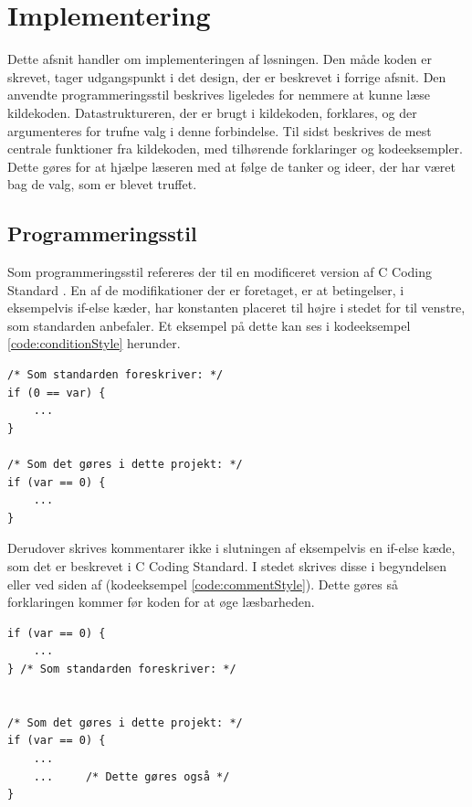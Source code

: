 \section{Implementering}\label{implementering}
Dette afsnit handler om implementeringen af løsningen. Den måde koden er skrevet, tager udgangspunkt i det design, der er beskrevet i forrige afsnit. Den anvendte programmeringsstil beskrives ligeledes for nemmere at kunne læse kildekoden. Datastruktureren, der er brugt i kildekoden, forklares, og der argumenteres for trufne valg i denne forbindelse. Til sidst beskrives de mest centrale funktioner fra kildekoden, med tilhørende forklaringer og kodeeksempler. Dette gøres for at hjælpe læseren med at følge de tanker og ideer, der har været bag de valg, som er blevet truffet.

\subsection*{Programmeringsstil}
Som programmeringsstil refereres der til en modificeret version af C Coding Standard \cite{codingstyle}. En af de modifikationer der er foretaget, er at betingelser, i eksempelvis if-else kæder, har konstanten placeret til højre i stedet for til venstre, som standarden anbefaler. Et eksempel på dette kan ses i kodeeksempel \ref{code:conditionStyle} herunder.

\begin{listing}[H]
\begin{verbatim}
/* Som standarden foreskriver: */
if (0 == var) {
    ...
}

/* Som det gøres i dette projekt: */
if (var == 0) {
    ...
}
\end{verbatim}
\label{code:conditionStyle}
\end{listing}

Derudover skrives kommentarer ikke i slutningen af eksempelvis en if-else kæde, som det er beskrevet i C Coding Standard. I stedet skrives disse i begyndelsen eller ved siden af (kodeeksempel \ref{code:commentStyle}). Dette gøres så forklaringen kommer før koden for at øge læsbarheden.

\begin{listing}[H]
\begin{verbatim}
if (var == 0) {
    ...
} /* Som standarden foreskriver: */


/* Som det gøres i dette projekt: */
if (var == 0) {
    ...
    ...     /* Dette gøres også */
}
\end{verbatim}
\label{code:commentStyle}
\end{listing}

